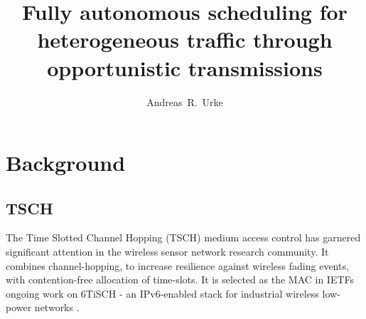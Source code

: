 \documentclass[journal,comsoc]{IEEEtran}
\begin{document}
\title{Fully autonomous scheduling for heterogeneous traffic through opportunistic transmissions}

\author{Andreas~R.~Urke

}


\maketitle

%


\section{Background}
\subsection{TSCH}
The Time Slotted Channel Hopping (TSCH) medium access control has garnered significant attention in the wireless sensor network research community. It combines channel-hopping, to increase resilience against wireless fading events, with contention-free allocation of time-slots. It is selected as the MAC in IETFs ongoing work on 6TiSCH - an IPv6-enabled stack for industrial wireless low-power networks \cite{IETF6TiSCHTutorialVilajosana2019}.
\end{document}
